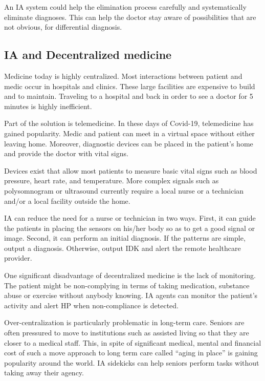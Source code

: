 \documentclass[11pt]{pnas-new}
\begin{document}
An IA system could help the elimination process carefully and
systematically eliminate diagnoses. This can help the doctor stay
aware of possibilities that are not obvious, for differential
diagnosis.


\subsection{IA and Decentralized medicine}

Medicine today is highly centralized. Most interactions
between patient and medic occur in hospitals and clinics. These
large facilities are expensive to build and to maintain. Traveling to
a hospital and back in order to see a doctor for 5 minutes is highly
inefficient. 

Part of the solution is telemedicine. In these days of Covid-19,
telemedicine has gained popularity. Medic and patient can meet in a
virtual space without either leaving home. Moreover, diagnostic
devices can be placed in the patient's home and provide the doctor with
vital signs.


Devices exist that allow most patients to measure basic vital signs
such as blood pressure, heart rate, and temperature. More complex signals such as
polysomnogram or ultrasound currently require a local nurse or a
technician and/or a local facility outside the home.

IA can reduce the need for a nurse or technician in two ways. First,
it can guide the patients in placing the sensors on his/her
body so as to get a good signal or image. Second, it can perform an
initial diagnosis. If the patterns are simple, output a diagnosis.
Otherwise, output IDK and alert the remote healthcare provider. 

One significant disadvantage of decentralized medicine is the lack of monitoring. The patient might be non-complying in terms of taking medication, substance abuse or exercise without anybody knowing. IA agents can monitor the patient's activity and alert HP when non-compliance is detected.

Over-centralization is particularly problematic in long-term care.
Seniors are often pressured to move to institutions such as
assisted living so that they are closer to a medical staff. This, in
spite of significant medical, mental and financial cost of such a
move approach to long term care called ``aging in
place'' is gaining popularity around the world. IA sidekicks can help
seniors perform tasks without taking away their agency.
\end{document}
